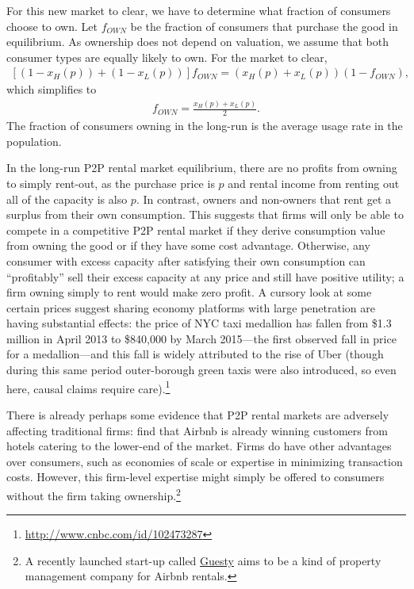 \documentclass[11pt]{article}
\begin{document}
For this new market to clear, we have to determine what fraction of consumers choose to own. 
Let $f_{OWN}$ be the fraction of consumers that purchase the good in equilibrium. 
As ownership does not depend on valuation, we assume that both consumer types are equally likely to own. 
For the market to clear, 
\begin{align}
\left[ (1-x_H(p)) + (1-x_L(p))\right]f_{OWN} = \left(x_H(p) + x_L(p) \right)(1- f_{OWN}), 
\end{align} 
which simplifies to 
\begin{align}
f_{OWN} = \frac{x_H(p) + x_L(p)}{2}.  
\end{align} 
The fraction of consumers owning in the long-run is the average usage rate in the population.  

In the long-run P2P rental market equilibrium, there are no profits from owning to simply rent-out, as the purchase price is $p$ and rental income from renting out all of the capacity is also $p$.  
In contrast, owners and non-owners that rent get a surplus from their own consumption. 
This suggests that firms will only be able to compete in a competitive P2P rental market if they derive consumption value from owning the good or if they have some cost advantage.
Otherwise, any consumer with excess capacity after satisfying their own consumption can ``profitably'' sell their excess capacity at any price and still have positive utility; a firm owning simply to rent would make zero profit.
A cursory look at some certain prices suggest sharing economy platforms with large penetration are having substantial effects:  
the price of NYC taxi medallion has fallen from \$1.3 million in April 2013 to \$840,000 by March 2015---the first observed fall in price for a medallion---and this fall is widely attributed to the rise of Uber (though during this same period outer-borough green taxis were also introduced, so even here, causal claims require care).\footnote{
  \url{http://www.cnbc.com/id/102473287}
}

There is already perhaps some evidence that P2P rental markets are adversely affecting traditional firms: 
\cite{byers2013rise} find that Airbnb is already winning customers from hotels catering to the lower-end of the market. 
Firms do have other advantages over consumers, such as economies of scale or expertise in minimizing transaction costs. 
However, this firm-level expertise might simply be offered to consumers without the firm taking ownership.\footnote{
  A recently launched start-up called \href{https://www.guesty.com/}{Guesty} aims to be a kind of property management company for Airbnb rentals.
} 
\end{document}
